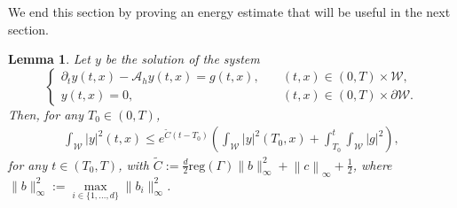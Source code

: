 \documentclass{amsart}
\numberwithin{equation}{section}
\newtheorem{lemma}[theorem]{Lemma}
\begin{document}
We end this section by proving an energy estimate that will be useful in the next section.
\begin{lemma}\label{lem:energy:estimate}
    Let $y$ be the solution of the system
    \begin{equation}\label{system:semi-discrete}
\begin{cases}
    \partial_{t}y(t,x)-\mathcal{A}_{h}y(t,x)=g(t,x),\quad &(t,x)\in(0,T)\times \mathcal{W},\\
    y(t,x)=0,  &(t,x)\in(0,T)\times\partial\mathcal{W}.
\end{cases}
\end{equation}
Then, for any $T_{0}\in(0,T)$,
\begin{align}\label{ine:energy:T0}
        \int_\mathcal{W} |y|^2(t,x)
        \leq e^{\tilde{C}(t-T_{0})}\left(\int_\mathcal{W} |y|^2(T_{0},x)+\int_{T_{0}}^{t}\int_{\mathcal{W}} |g|^2\right),
\end{align}
for any $t\in (T_{0},T)$, with $\tilde{C}:= \frac{d}{2}\mathrm {reg}(\Gamma)\|b\|^2_\infty+\left\| c\right\|_{\infty}+\frac{1}{2}$, where $\|b\|_\infty^2:= \max\limits_{i\in\{1,...,d\}}\|b_i\|^2_\infty$.
\end{lemma}
\end{document}
